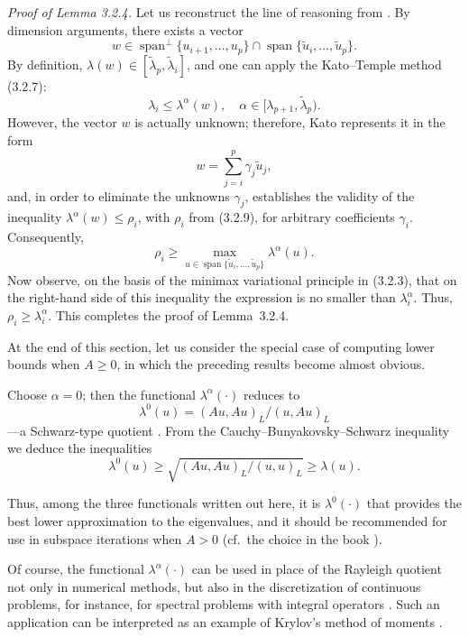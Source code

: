 \documentclass[11pt,oneside]{book}
\newcommand{\myspan}{\operatorname{span}}
\begin{document}
\textit{Proof of Lemma 3.2.4.} Let us reconstruct the line of reasoning from \citep{Kato1949}. By dimension arguments, there exists a vector
\[
w \in \myspan^{\perp}\{u_{i+1}, \ldots, u_p\} \cap \myspan\{\tilde{u}_i, \ldots, \tilde{u}_p\}.
\]
By definition, $\lambda(w) \in [\tilde{\lambda}_p, \tilde{\lambda}_i]$, and one can apply the Kato--Temple method (3.2.7):
\[
\lambda_i \leqslant \lambda^\alpha(w), \quad \alpha \in [\lambda_{p+1}, \tilde{\lambda}_p).
\]
However, the vector $w$ is actually unknown; therefore, Kato represents it in the form
\[
w = \sum_{j=i}^p \gamma_j \tilde{u}_j,
\]
and, in order to eliminate the unknowns $\gamma_j$, establishes the validity of the inequality $\lambda^\alpha(w) \leqslant \rho_i$, with $\rho_i$ from (3.2.9), for arbitrary coefficients $\gamma_i$. Consequently, %
\[
\rho_i \geqslant \max_{u \in \myspan\{\tilde{u}_i, \ldots, \tilde{u}_p\}} \lambda^\alpha(u).
\]
Now observe, on the basis of the minimax variational principle in (3.2.3), that on the right-hand side of this inequality the expression is no smaller than $\lambda_i^\alpha$. Thus, $\rho_i \geqslant \lambda_i^\alpha$. This completes the proof of Lemma~3.2.4.

At the end of this section, let us consider the special case of computing lower bounds when $A \geqslant 0$, in which the preceding results become almost obvious.

Choose $\alpha = 0$; then the functional $\lambda^\alpha(\cdot)$ reduces to
\[
\lambda^0(u) = (Au, Au)_L / (u, Au)_L
\tag{3.2.12}
\]
---a Schwarz-type quotient \citep[p.~179]{Collatz1968ru}. From the Cauchy--Bunyakovsky--Schwarz inequality we deduce the inequalities
\[
\lambda^0(u) \geqslant \sqrt{(Au, Au)_L / (u, u)_L} \geqslant \lambda(u).
\]

Thus, among the three functionals written out here, it is $\lambda^0(\cdot)$ that provides the best lower approximation to the eigenvalues, and it should be recommended for use in subspace iterations when $A > 0$ (cf.\ the choice in the book \citep[pp.~311--321]{Parlett1983}).

Of course, the functional $\lambda^\alpha(\cdot)$ can be used in place of the Rayleigh quotient not only in numerical methods, but also in the discretization of continuous problems, for instance, for spectral problems with integral operators \citep{Fichera1978,Chatelin1983}. Such an application can be interpreted as an example of Krylov's method of moments \citep[p.~87]{LuchkaLuchka1985}.
\end{document}
